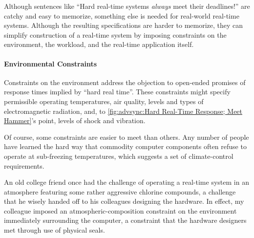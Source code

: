 Although sentences like ``Hard real-time systems \emph{always} meet
their deadlines!\@'' are catchy and easy to memorize, something else is
needed for real-world real-time systems.
Although the resulting specifications are
harder to memorize, they can simplify construction of a real-time
system by imposing constraints on the environment, the workload, and
the real-time application itself.

\paragraph{Environmental Constraints}
\label{sec:advsync:Environmental Constraints}

Constraints on the environment address the objection to open-ended
promises of response times implied by ``hard real time''.
These constraints might specify permissible operating temperatures,
air quality, levels and types of electromagnetic radiation, and, to
\cref{fig:advsync:Hard Real-Time Response; Meet Hammer}'s
point, levels of shock and vibration.

Of course, some constraints are easier to meet than others.
Any number of people have learned the hard way that
commodity computer components often refuse to operate at sub-freezing
temperatures, which suggests a set of climate-control requirements.

An old college friend once had the challenge of operating
a real-time system in an atmosphere featuring some rather aggressive
chlorine compounds, a challenge that he wisely handed off to his
colleagues designing the hardware.
In effect, my colleague imposed an atmospheric-composition constraint
on the environment immediately surrounding the computer, a constraint
that the hardware designers met through use of physical seals.

